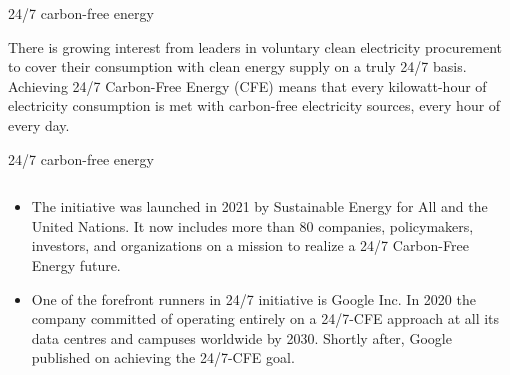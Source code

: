 \begin{frame}{24/7 carbon-free energy}

  \centering

  There is growing interest from leaders in voluntary clean
  electricity procurement to cover their consumption 
  with clean energy supply on a \alert{truly 24/7 basis}. \\
  \vspace{0.3cm}
  Achieving 24/7 Carbon-Free Energy (CFE) means that every kilowatt-hour of electricity consumption is met
  with carbon-free electricity sources, \alert{every hour of every day}.
  
\end{frame}



\begin{frame}{24/7 carbon-free energy}
  
  \begin{columns}[T]
  \begin{column}{8cm}

    \begin{itemize}
    \item The  
    initiative was launched in 2021 by Sustainable Energy for All and the United Nations. 
    It now includes more than 80 companies, policymakers, investors, and organizations 
    on a mission to realize a 24/7 Carbon-Free Energy future. 

    \item One of the forefront runners in 24/7 initiative is Google Inc. In 2020 the company committed 
    of operating entirely on a 24/7-CFE approach at all its data centres and campuses worldwide by 2030. 
    Shortly after, Google published 
    on achieving the 24/7-CFE goal.

    \end{itemize}
  \end{column}


\end{columns}
\end{frame}
